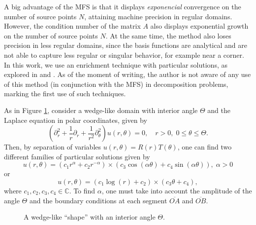 \documentclass[5p,authoryear]{elsarticle}
\begin{document}
A big advantage of the MFS is that it displays \textit{exponencial} convergence on the number of source points \(N\), attaining machine precision in regular domains. However, the condition number of the matrix \(A\) also displays exponential growth on the number of source points \(N\). At the same time, the method also loses precision in less regular domains, since the basis functions are analytical and are not able to capture less regular or singular behavior, for example near a corner. In this work, we use an enrichment technique with particular solutions, as explored in \cite{betcke2005reviving} and \cite{antunes2010meshfree}. As of the moment of writing, the author is not aware of any use of this method (in conjunction with the MFS) in decomposition problems, marking the first use of such techniques.

As in Figure \ref{wedge}, consider a wedge-like domain with interior angle \(\Theta\) and the Laplace equation in polar coordinates, given by
\begin{equation}\label{lap_polar}
    \left(\partial_r^2 + \frac{1}{r} \partial_r +\frac{1}{r^2}\partial_\theta^2\right)u(r,\theta) = 0, \quad r>0, \; 0 \leq \theta \leq \Theta.
\end{equation}
Then, by separation of variables \(u(r, \theta) = R(r) T(\theta)\), one can find two different families of particular solutions given by
\begin{equation}\label{particular_sol_with_alpha}
    u(r,\theta) = \left(c_1 r^\alpha + c_2 r^{-\alpha}\right) \times \left(c_3 \cos(\alpha \theta) + c_4 \sin(\alpha \theta)\right), \; \alpha >0
\end{equation}
or
\begin{equation}\label{particular_sol_without_alpha}
    u(r,\theta) = \left(c_1 \log (r) + c_2 \right) \times \left(c_3 \theta + c_4 \right),
\end{equation}
where \(c_1, c_2, c_3, c_4 \in \mathbb{C}\). To find \(\alpha\), one must take into account the amplitude of the angle \(\Theta\) and the boundary conditions at each segment \(\overline{OA}\) and \(\overline{OB}\).
\begin{figure}
\centering
{}
\caption{A wedge-like ``shape'' with an interior angle \(\Theta\).}\label{wedge}
\end{figure}
\end{document}
